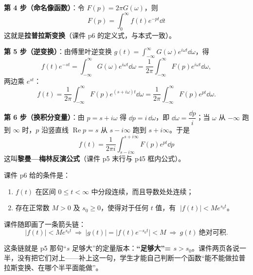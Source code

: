 \documentclass[11pt]{ctexart}
\begin{document}
\textbf{第 4 步（命名像函数）}：令 $F(p)=2\pi G(\omega)$，则
\[ \boxed{\,F(p)=\int_{0}^{\infty}f(t)e^{-pt}\dd t\,} \]
这就是\textbf{拉普拉斯变换}（课件 p6 的定义式，与本式一致）。

\textbf{第 5 步（逆变换）}：由傅里叶逆变换 $g(t)=\int_{-\infty}^{\infty}G(\omega)e^{i\omega t}\dd\omega$，得
\[ f(t)e^{-st}=\int_{-\infty}^{\infty}G(\omega)e^{i\omega t}\dd\omega
=\frac{1}{2\pi}\int_{-\infty}^{\infty}F(p)e^{i\omega t}\dd\omega ,\]
两边乘 $e^{st}$：
\[ f(t)=\frac{1}{2\pi}\int_{-\infty}^{\infty}F(p)e^{(s+i\omega)t}\dd\omega
=\frac{1}{2\pi}\int_{-\infty}^{\infty}F(p)e^{pt}\dd\omega .\]

\textbf{第 6 步（换积分变量）}：由 $p=s+i\omega$ 得 $\dd p=i\,\dd\omega$，即 $\dd\omega=\dfrac{\dd p}{i}$；当 $\omega$ 从 $-\infty$ 跑到 $\infty$ 时，$p$ 沿竖直线 $\operatorname{Re}p=s$ 从 $s-i\infty$ 跑到 $s+i\infty$。于是
\[ \boxed{\,f(t)=\frac{1}{2\pi i}\int_{s-i\infty}^{s+i\infty}F(p)e^{pt}\dd p\,} \]
这叫\textbf{黎曼—梅林反演公式}（课件 p5 末行与 p45 框内公式）。



课件 p6 给的条件是：

\begin{enumerate}
\item $f(t)$ 在区间 $0\le t<\infty$ 中分段连续，而且导数处处连续；
\item 存在正常数 $M>0$ 及 $s_0\ge 0$，使得对于任何 $t$ 值，有 $\;|f(t)|<Me^{s_0t}$。
\end{enumerate}

课件随即画了一条箭头链：
\[ |f(t)|<Me^{s_0t}\ \Longrightarrow\ |g(t)|=\bigl|f(t)e^{-s_0t}\bigr|<M\ \Longrightarrow\ g(t)\ \text{绝对可积} .\]

这条链就是 p5 那句“$s$ 足够大”的定量版本：\textbf{“足够大”= $s>s_0$}。课件两页各说一半，没有把它们对上——补上这一句，学生才能自己判断一个函数“能不能做拉普拉斯变换、在哪个半平面能做”。

\end{document}
